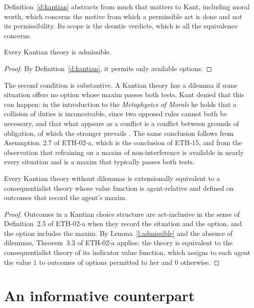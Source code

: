 \documentclass{situationist-preprint}
\begin{document}
Definition~\ref{d:kantian} abstracts from much that matters to Kant, including moral worth, which concerns the motive from which a permissible act is done and not its permissibility. Its scope is the deontic verdicts, which is all the equivalence concerns.

\begin{lemma}\label{l:admissible}
Every Kantian theory is admissible.
\end{lemma}

\begin{proof}
By Definition~\ref{d:kantian}, it permits only available options.
\end{proof}

The second condition is substantive. A Kantian theory has a dilemma if some situation offers no option whose maxim passes both tests. Kant denied that this can happen: in the introduction to the \emph{Metaphysics of Morals} he holds that a collision of duties is inconceivable, since two opposed rules cannot both be necessary, and that what appears as a conflict is a conflict between grounds of obligation, of which the stronger prevails \citep{Kant1797}. The same conclusion follows from Assumption~2.7 of ETH-02-a, which is the conclusion of ETH-15, and from the observation that refraining on a maxim of non-interference is available in nearly every situation and is a maxim that typically passes both tests.

\begin{proposition}\label{p:kantcons}
Every Kantian theory without dilemmas is extensionally equivalent to a consequentialist theory whose value function is agent-relative and defined on outcomes that record the agent's maxim.
\end{proposition}

\begin{proof}
Outcomes in a Kantian choice structure are act-inclusive in the sense of Definition~2.5 of ETH-02-a when they record the situation and the option, and the option includes the maxim. By Lemma~\ref{l:admissible} and the absence of dilemmas, Theorem~3.3 of ETH-02-a applies: the theory is equivalent to the consequentialist theory of its indicator value function, which assigns to each agent the value $1$ to outcomes of options permitted to her and $0$ otherwise.
\end{proof}

\section{An informative counterpart}
\end{document}
